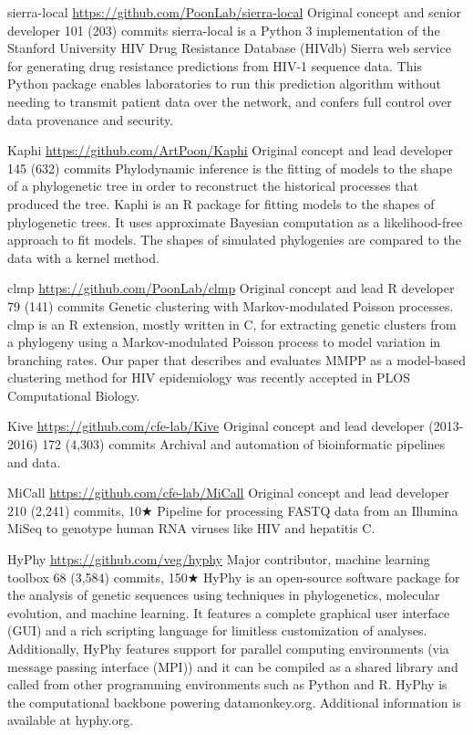 {sierra-local}
{\url{https://github.com/PoonLab/sierra-local}}
{Original concept and senior developer}
{101 (203) commits}
{sierra-local is a Python 3 implementation of the Stanford University HIV Drug Resistance Database (HIVdb) Sierra web service for generating drug resistance predictions from HIV-1 sequence data. This Python package enables laboratories to run this prediction algorithm without needing to transmit patient data over the network, and confers full control over data provenance and security.}


{Kaphi}
{\url{https://github.com/ArtPoon/Kaphi}}
{Original concept and lead developer}
{145 (632) commits}
{Phylodynamic inference is the fitting of models to the shape of a phylogenetic tree in order to reconstruct the historical processes that produced the tree.
Kaphi is an R package for fitting models to the shapes of phylogenetic trees.
It uses approximate Bayesian computation as a likelihood-free approach to fit models.
The shapes of simulated phylogenies are compared to the data with a kernel method.}



{clmp}
{\url{https://github.com/PoonLab/clmp}}
{Original concept and lead R developer}
{79 (141) commits}
{Genetic clustering with Markov-modulated Poisson processes. 
clmp is an R extension, mostly written in C, for extracting genetic clusters from a phylogeny using a Markov-modulated Poisson process to model variation in branching rates. Our paper that describes and evaluates MMPP as a model-based clustering method for HIV epidemiology was recently accepted in PLOS Computational Biology.
}


{Kive}
{\url{https://github.com/cfe-lab/Kive}}
{Original concept and lead developer (2013-2016)}
{172 (4,303) commits}
{Archival and automation of bioinformatic pipelines and data.}


{MiCall}
{\url{https://github.com/cfe-lab/MiCall}}
{Original concept and lead developer}
{210 (2,241) commits, 10$\bigstar$}
{Pipeline for processing FASTQ data from an Illumina MiSeq to genotype human RNA viruses like HIV and hepatitis C.}


{HyPhy}
{\url{https://github.com/veg/hyphy}}
{Major contributor, machine learning toolbox}
{68 (3,584) commits, 150$\bigstar$}
{HyPhy is an open-source software package for the analysis of genetic sequences using techniques in phylogenetics, molecular evolution, and machine learning. It features a complete graphical user interface (GUI) and a rich scripting language for limitless customization of analyses. Additionally, HyPhy features support for parallel computing environments (via message passing interface (MPI)) and it can be compiled as a shared library and called from other programming environments such as Python and R. HyPhy is the computational backbone powering datamonkey.org. Additional information is available at hyphy.org.}



